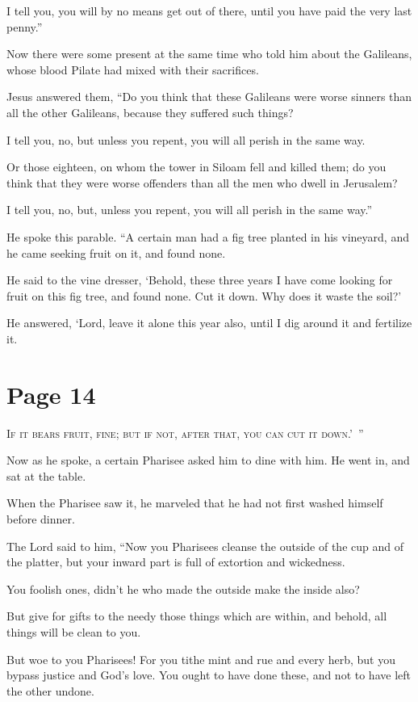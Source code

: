 I tell you, you will by no means get out of there, until you have paid the very last penny.”

Now there were some present at the same time who told him about the Galileans, whose blood Pilate had mixed with their sacrifices.

Jesus answered them, “Do you think that these Galileans were worse sinners than all the other Galileans, because they suffered such things?

I tell you, no, but unless you repent, you will all perish in the same way.

Or those eighteen, on whom the tower in Siloam fell and killed them; do you think that they were worse offenders than all the men who dwell in Jerusalem?

I tell you, no, but, unless you repent, you will all perish in the same way.”

He spoke this parable. “A certain man had a fig tree planted in his vineyard, and he came seeking fruit on it, and found none.

He said to the vine dresser, ‘Behold, these three years I have come looking for fruit on this fig tree, and found none. Cut it down. Why does it waste the soil?’

He answered, ‘Lord, leave it alone this year also, until I dig around it and fertilize it.



\chapterornament
\section*{Page 14}

\lettrine{I}{f it bears fruit, fine; but if not, after that, you can cut it down.’ ”}

Now as he spoke, a certain Pharisee asked him to dine with him. He went in, and sat at the table.

When the Pharisee saw it, he marveled that he had not first washed himself before dinner.

The Lord said to him, “Now you Pharisees cleanse the outside of the cup and of the platter, but your inward part is full of extortion and wickedness.

You foolish ones, didn’t he who made the outside make the inside also?

But give for gifts to the needy those things which are within, and behold, all things will be clean to you.

But woe to you Pharisees! For you tithe mint and rue and every herb, but you bypass justice and God’s love. You ought to have done these, and not to have left the other undone.

